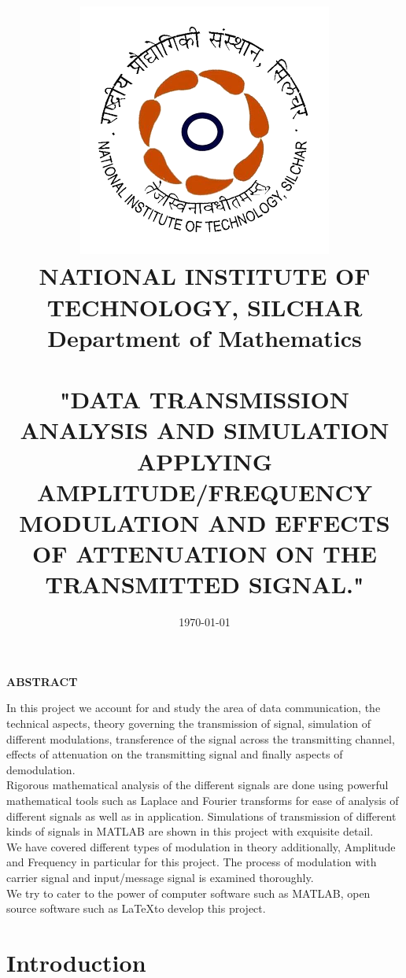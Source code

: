 \documentclass[12pt,a4paper]{article}%
\begin{document}
	
	
	\begin{titlepage}
	\title{\includegraphics[width=0.38 \textwidth]{./NIT_Silchar_logo.png}\\\textbf{\large NATIONAL INSTITUTE OF TECHNOLOGY, SILCHAR}\\\textbf{{\large Department of Mathematics}}\\\\\bigskip\textbf{{\normalsize "DATA TRANSMISSION ANALYSIS AND SIMULATION APPLYING AMPLITUDE/FREQUENCY MODULATION AND EFFECTS OF ATTENUATION ON THE TRANSMITTED SIGNAL." }}}
	\date{\today}
	\clearpage\maketitle
	\thispagestyle{empty}
	\end{titlepage}
	
	\begin{center}
		\textbf{\large ABSTRACT}
	\end{center}
    \begin{flushleft}
    	\fontsize{12pt}{18pt}\selectfont
    	 In this project we account for and study the area of data communication, the technical aspects, theory governing the transmission of signal, simulation of different modulations, transference of the signal across the transmitting channel, effects of attenuation on the transmitting signal and finally aspects of demodulation.\\\bigskip
    	 Rigorous mathematical analysis of the different signals are done using powerful mathematical tools such as Laplace and Fourier transforms for ease of analysis of
    	 different signals as well as in application. Simulations of transmission of different kinds of signals in MATLAB are shown in this project with exquisite detail.\\\bigskip
    	 We have covered different types of modulation in theory additionally, Amplitude and Frequency in particular for this project. The process of modulation with carrier signal
    	 and input/message signal is examined thoroughly.\\\bigskip
    	 We try to cater to the power of computer software such as MATLAB, open source software such as \LaTeX to develop this project.
	\end{flushleft}
	
	\pagebreak
	\tableofcontents
	\cleardoublepage
	\section{Introduction}\label{sec:intro}
	
 	
\end{document}

